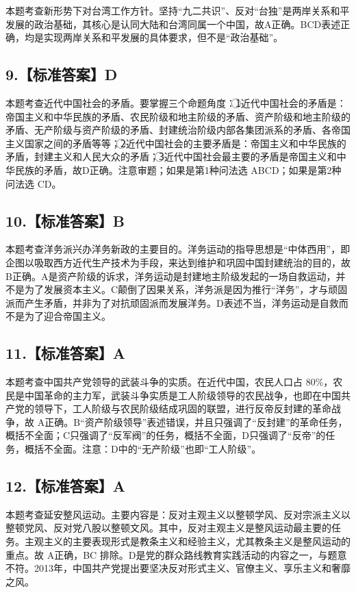 \documentclass[UTF8,11pt]{ctexart}
\begin{document}
本题考查新形势下对台湾工作方针。坚持“九二共识”、反对“台独”是两岸关系和平发展的政治基础，其核心是认同大陆和台湾同属一个中国，故A正确。BCD表述正确，均是实现两岸关系和平发展的具体要求，但不是“政治基础”。


\subsection*{9.【标准答案】D}

本题考查近代中国社会的矛盾。要掌握三个命题角度：\textcircled{1}近代中国社会的矛盾是：帝国主义和中华民族的矛盾、农民阶级和地主阶级的矛盾、资产阶级和地主阶级的矛盾、无产阶级与资产阶级的矛盾、封建统治阶级内部各集团派系的矛盾、各帝国主义国家之间的矛盾等等；\textcircled{2}近代中国社会的主要矛盾是：帝国主义和中华民族的矛盾，封建主义和人民大众的矛盾；\textcircled{3}近代中国社会最主要的矛盾是帝国主义和中华民族的矛盾，故D正确。注意审题；如果是第1种问法选 ABCD；如果是第2种问法选 CD。


\subsection*{10.【标准答案】B}

本题考查洋务派兴办洋务新政的主要目的。洋务运动的指导思想是“中体西用”，即企图以吸取西方近代生产技术为手段，来达到维护和巩固中国封建统治的目的，故B正确。A是资产阶级的诉求，洋务运动是封建地主阶级发起的一场自救运动，并不是为了发展资本主义。C颠倒了因果关系，洋务派是因为推行“洋务”，才与顽固派而产生矛盾，并非为了对抗顽固派而发展洋务。D表述不当，洋务运动是自救而不是为了迎合帝国主义。


\subsection*{11.【标准答案】A}

本题考查中国共产党领导的武装斗争的实质。在近代中国，农民人口占 80\%，农民是中国革命的主力军，武装斗争实质是工人阶级领导的农民战争，也即在中国共产党的领导下，工人阶级与农民阶级结成巩固的联盟，进行反帝反封建的革命战争，故 A正确。B“资产阶级领导”表述错误，并且只强调了“反封建”的革命任务，概括不全面；C只强调了“反军阀”的任务，概括不全面，D只强调了“反帝”的任务，概括不全面。注意：D中的“无产阶级”也即“工人阶级”。


\subsection*{12.【标准答案】A}

本题考查延安整风运动。主要内容是：反对主观主义以整顿学风、反对宗派主义以整顿党风、反对党八股以整顿文风。其中，反对主观主义是整风运动最主要的任务。主观主义的主要表现形式是教条主义和经验主义，尤其教条主义是整风运动的重点。故 A正确，BC 排除。D是党的群众路线教育实践活动的内容之一，与题意不符。2013年，中国共产党提出要坚决反对形式主义、官僚主义、享乐主义和奢靡之风。
\end{document}
